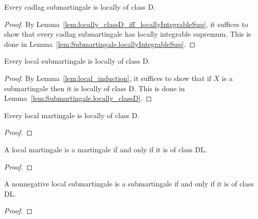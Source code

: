 \begin{lemma}\label{lem:Submartingale.locally_classD}
Every cadlag submartingale is locally of class D.
\end{lemma}

\begin{proof}
By Lemma~\ref{lem:locally_classD_iff_locallyIntegrableSup}, it suffices to show that every cadlag submartingale has locally integrable supremum.
This is done in Lemma~\ref{lem:Submartingale.locallyIntegrableSup}.
\end{proof}


\begin{lemma}\label{lem:IsLocalSubmartingale.locally_classD}
Every local submartingale is locally of class D.
\end{lemma}

\begin{proof}
By Lemma~\ref{lem:local_induction}, it suffices to show that if $X$ is a submartingale then it is locally of class D.
This is done in Lemma~\ref{lem:Submartingale.locally_classD}.
\end{proof}


\begin{lemma}\label{lem:IsLocalMartingale.locally_classD}
Every local martingale is locally of class D.
\end{lemma}

\begin{proof}

\end{proof}


\begin{lemma}\label{lem:IsLocalMartingale.martingale_iff_classDL}
A local martingale is a martingale if and only if it is of class DL.
\end{lemma}

\begin{proof}

\end{proof}


\begin{lemma}\label{lem:IsLocalSubmartingale.submartingale_iff_classDL_of_nonnegative}
A nonnegative local submartingale is a submartingale if and only if it is of class DL.
\end{lemma}

\begin{proof}

\end{proof}
